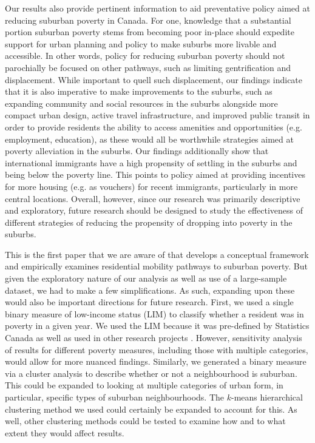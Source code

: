 Our results also provide pertinent information to aid preventative policy aimed at reducing suburban poverty in Canada. For one, knowledge that a substantial portion suburban poverty stems from becoming poor in-place should expedite support for urban planning and policy to make suburbs more livable and accessible. In other words, policy for reducing suburban poverty should not parochially be focused on other pathways, such as limiting gentrification and displacement. While important to quell such displacement, our findings indicate that it is also imperative to make improvements to the suburbs, such as expanding community and social resources in the suburbs alongside more compact urban design, active travel infrastructure, and improved public transit in order to provide residents the ability to access amenities and opportunities (e.g. employment, education), as these would all be worthwhile strategies aimed at poverty alleviation in the suburbs. Our findings additionally show that international immigrants have a high propensity of settling in the suburbs and being below the poverty line. This points to policy aimed at providing incentives for more housing (e.g. as vouchers) for recent immigrants, particularly in more central locations. Overall, however, since our research was primarily descriptive and exploratory, future research should be designed to study the effectiveness of different strategies of reducing the propensity of dropping into poverty in the suburbs.

This is the first paper that we are aware of that develops a conceptual framework and empirically examines residential mobility pathways to suburban poverty. But given the exploratory nature of our analysis as well as use of a large-sample dataset, we had to make a few simplifications. As such, expanding upon these would also be important directions for future research. First, we used a single binary measure of low-income status (LIM) to classify whether a resident was in poverty in a given year. We used the LIM because it was pre-defined by Statistics Canada as well as used in other research projects \cite{picot_immigration_2014,allen_sizing_2019,brown_money_2019}. However, sensitivity analysis of results for different poverty measures, including those with multiple categories, would allow for more nuanced findings. Similarly, we generated a binary measure via a cluster analysis to describe whether or not a neighbourhood is suburban. This could be expanded to looking at multiple categories of urban form, in particular, specific types of suburban neighbourhoods. The $k$-means hierarchical clustering method we used could certainly be expanded to account for this. As well, other clustering methods could be tested to examine how and to what extent they would affect results.

